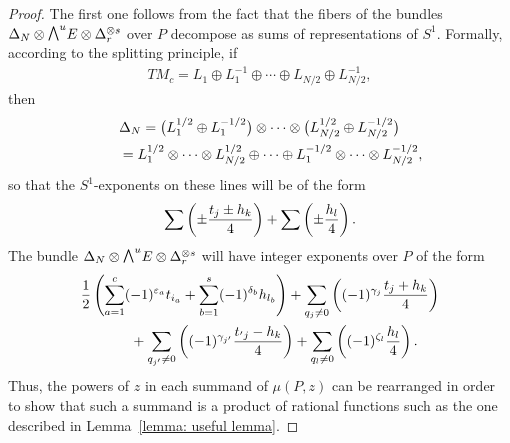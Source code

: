 \documentclass[pdftex]{sigma}
\newcommand{\ext}{\raise1pt\hbox{$\textstyle\bigwedge$}}
\numberwithin{equation}{section}
\begin{document}
\begin{proof}
The f\/irst one follows from the fact that the f\/ibers of the bundles $\Delta_N\otimes \ext^uE\otimes \Delta_r^{\otimes s}$ over $P$ decompose as sums of representations of $S^1$. Formally, according to the splitting principle, if
\begin{gather*}
TM_c= L_1\oplus L_1^{-1}\oplus\cdots\oplus L_{N/2}\oplus L_{N/2}^{-1},
\end{gather*}
then
\begin{gather*}
\Delta_N= \big(L_1^{1/2}\oplus L_1^{-1/2}\big)\otimes\cdots \otimes\big(L_{N/2}^{1/2}\oplus L_{N/2}^{-1/2}\big)\\
\hphantom{\Delta_N}{} = L_1^{1/2}\otimes\cdots\otimes L_{N/2}^{1/2}\oplus\cdots\oplus L_1^{-1/2}\otimes\cdots\otimes L_{N/2}^{-1/2},
\end{gather*}
so that the $S^1$-exponents on these lines will be of the form
\begin{gather*}\sum \left(\pm{t_j\pm h_k\over 4}\right) + \sum \left(\pm{h_l\over 4}\right).\end{gather*}
The bundle $\Delta_N\otimes \ext^uE\otimes \Delta_r^{\otimes s}$ will have integer exponents over $P$ of the form
\begin{gather*}
{1\over 2}\left(\sum_{a=1}^c (-1)^{\varepsilon_a}t_{i_a}+\sum_{b=1}^s (-1)^{\delta_b}h_{l_b}\right)
+\sum_{q_j\not=0} \left((-1)^{\gamma_j}{t_j+ h_k\over 4}\right) \\
\qquad{} +\sum_{q_{j'}\not=0} \left((-1)^{\gamma_{j'}}{t_{'j}- h_k\over 4}\right)
+ \sum_{q_l\not=0} \left((-1)^{\zeta_l}{h_l\over 4}\right).
\end{gather*}
Thus, the powers of $z$ in each summand of $\mu(P,z)$ can be rearranged in order to show that such a summand is a product of rational functions
such as the one described in Lemma~\ref{lemma: useful lemma}.


\end{proof}
\end{document}
